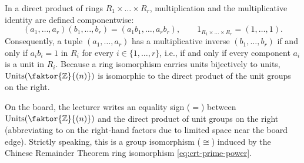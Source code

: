 \begin{content}

\begin{steps}
In a direct product of rings $R_1 \times \dots \times R_r$, multiplication and the multiplicative identity are defined componentwise:
\[
(a_1, \dots, a_r)(b_1, \dots, b_r) = (a_1 b_1, \dots, a_r b_r), \qquad 1_{R_1 \times \dots \times R_r} = (1, \dots, 1).
\]
Consequently, a tuple $(a_1, \dots, a_r)$ has a multiplicative inverse $(b_1, \dots, b_r)$ if and only if $a_i b_i = 1$ in $R_i$ for every $i \in \{1, \dots, r\}$, i.e., if and only if every component $a_i$ is a unit in $R_i$. Because a ring isomorphism carries units bijectively to units, $\operatorname{Units}\!\left(\faktor{\mathbb{Z}}{(n)}\right)$ is isomorphic to the direct product of the unit groups on the right.
\end{steps}
\end{content}

\begin{aiNote}
On the board, the lecturer writes an equality sign ($=$) between $\operatorname{Units}\!\left(\faktor{\mathbb{Z}}{(n)}\right)$ and the direct product of unit groups on the right (abbreviating  to  on the right-hand factors due to limited space near the board edge). Strictly speaking, this is a group isomorphism ($\cong$) induced by the Chinese Remainder Theorem ring isomorphism \eqref{eq:crt-prime-power}.
\end{aiNote}

\begin{hidden}
\end{hidden}

